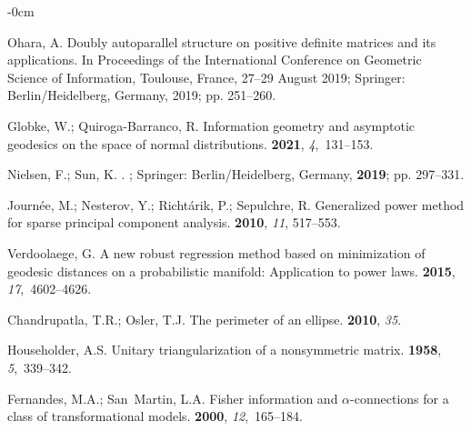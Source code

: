 \documentclass[entropy,article,accept,oneauthor,pdftex,entropy]{Definitions/mdpi}
\begin{document}
\begin{adjustwidth}{-\extralength}{0cm}
\begin{thebibliography}{999}
Ohara, A.
\newblock Doubly autoparallel structure on positive definite matrices and its
  applications.
\newblock In Proceedings of the International Conference on Geometric Science
  of Information, {Toulouse, France, 27--29 August 2019}; Springer: {Berlin/Heidelberg, Germany,} 
  2019; pp. 251--260.

Globke, W.; Quiroga-Barranco, R.
\newblock Information geometry and asymptotic geodesics on the space of normal
  distributions.
 {\bf 2021}, {\em 4},~131--153.

Nielsen, F.; Sun, K.
.
; Springer: {Berlin/Heidelberg, Germany,}  {\bf 2019}; pp. 297--331.
 


Journ{\'e}e, M.; Nesterov, Y.; Richt{\'a}rik, P.; Sepulchre, R.
\newblock Generalized power method for sparse principal component analysis.
 {\bf 2010}, {\em 11}, {517--553.} %


Verdoolaege, G.
\newblock A new robust regression method based on minimization of geodesic
  distances on a probabilistic manifold: Application to power laws.
 {\bf 2015}, {\em 17},~4602--4626.

Chandrupatla, T.R.; Osler, T.J.
\newblock The perimeter of an ellipse.
 {\bf 2010}, {\em 35}.

Householder, A.S.
\newblock Unitary triangularization of a nonsymmetric matrix.
 {\bf 1958}, {\em 5},~339--342.

Fernandes, M.A.; San~Martin, L.A.
\newblock Fisher information and $\alpha$-connections for a class of
  transformational models.
 {\bf 2000}, {\em
  12},~165--184.


\end{thebibliography}
\end{adjustwidth}
\end{document}
